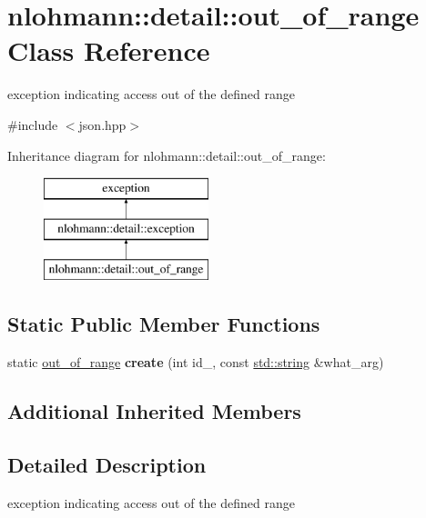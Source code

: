 \hypertarget{classnlohmann_1_1detail_1_1out__of__range}{}\section{nlohmann\+:\+:detail\+:\+:out\+\_\+of\+\_\+range Class Reference}
\label{classnlohmann_1_1detail_1_1out__of__range}


exception indicating access out of the defined range  




{\ttfamily \#include $<$json.\+hpp$>$}

Inheritance diagram for nlohmann\+:\+:detail\+:\+:out\+\_\+of\+\_\+range\+:\begin{figure}[H]
\begin{center}
\leavevmode
\includegraphics[height=3.000000cm]{d2/d67/classnlohmann_1_1detail_1_1out__of__range}
\end{center}
\end{figure}
\subsection*{Static Public Member Functions}
\begin{DoxyCompactItemize}
\item 
\mbox{\label{classnlohmann_1_1detail_1_1out__of__range_a3f6d82a6f967c4728a1ec735a7867073}} 
static \mbox{\hyperlink{classnlohmann_1_1detail_1_1out__of__range}{out\+\_\+of\+\_\+range}} {\bfseries create} (int id\+\_\+, const \mbox{\hyperlink{namespacenlohmann_1_1detail_a90aa5ef615aa8305e9ea20d8a947980fab45cffe084dd3d20d928bee85e7b0f21}{std\+::string}} \&what\+\_\+arg)
\end{DoxyCompactItemize}
\subsection*{Additional Inherited Members}


\subsection{Detailed Description}
exception indicating access out of the defined range 

